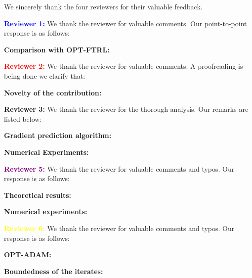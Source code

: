 \documentclass{article}
\begin{document}
We sincerely thank the four reviewers for their valuable feedback. 

\vspace{0.05in}

\textbf{\textcolor{blue}{Reviewer 1:}} We thank the reviewer for valuable comments. Our point-to-point response is as follows:\vspace{-5pt}


\textbf{Comparison with OPT-FTRL:} 

\vspace{0.05in}


\textbf{\textcolor{red}{Reviewer 2:}} We thank the reviewer for valuable comments. A proofreading is being done we clarify that:\vspace{-5pt}

\textbf{Novelty of the contribution:} 

\vspace{0.05in}
\textbf{\textcolor{green!50!black}{Reviewer 3:}} We thank the reviewer for the thorough analysis. Our remarks are listed below:\vspace{-5pt}

\textbf{Gradient prediction algorithm:}

\textbf{Numerical Experiments:}

\vspace{0.05in}

\textbf{\textcolor{purple}{Reviewer 5:}} We thank the reviewer for valuable comments and typos. Our response is as follows:\vspace{-5pt}

\textbf{Theoretical results:}


\textbf{Numerical experiments:}


\textbf{\textcolor{yellow}{Reviewer 6:}} We thank the reviewer for valuable comments and typos. Our response is as follows:\vspace{-5pt}

\textbf{OPT-ADAM:}

\textbf{Boundedness of the iterates:}
\end{document}
